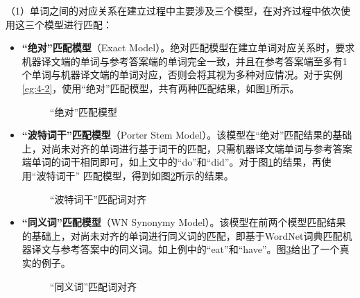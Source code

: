 \parinterval （1）单词之间的对应关系在建立过程中主要涉及三个模型，在对齐过程中依次使用这三个模型进行匹配：

\begin{itemize}
\vspace{0.5em}
\item {\small\sffamily\bfseries{“绝对”匹配模型}}（Exact Model）。绝对匹配模型在建立单词对应关系时，要求机器译文端的单词与参考答案端的单词完全一致，并且在参考答案端至多有1个单词与机器译文端的单词对应，否则会将其视为多种对应情况。对于实例\ref{eg:4-2}，使用“绝对”匹配模型，共有两种匹配结果，如图\ref{fig:4-3}所示。

\begin{figure}[htp]
    \centering
	\subfigure[“绝对”匹配词对齐-1]{}
	\subfigure[“绝对”匹配词对齐-2]{}
   \caption{“绝对”匹配模型}
   \label{fig:4-3}
\end{figure}

\vspace{0.5em}
\item {\small\sffamily\bfseries{“波特词干”匹配模型}}（Porter Stem Model）。该模型在“绝对”匹配结果的基础上，对尚未对齐的单词进行基于词干的匹配，只需机器译文端单词与参考答案端单词的词干相同即可，如上文中的“do”和“did”。对于图\ref{fig:4-3}的结果，再使用“波特词干” 匹配模型，得到如图\ref{fig:4-4}所示的结果。

\begin{figure}[htp]
    \centering
	
    \caption{“波特词干”匹配词对齐}
    \label{fig:4-4}
\end{figure}

\vspace{0.5em}
\item {\small\sffamily\bfseries{“同义词”匹配模型}}（WN Synonymy Model）。该模型在前两个模型匹配结果的基础上，对尚未对齐的单词进行同义词的匹配，即基于WordNet词典匹配机器译文与参考答案中的同义词。如上例中的“eat”和“have”。图\ref{fig:4-5}给出了一个真实的例子。

\begin{figure}[htp]
    \centering
    
    \caption{“同义词”匹配词对齐}
    \label{fig:4-5}
\end{figure}

\vspace{0.5em}
\end{itemize}

